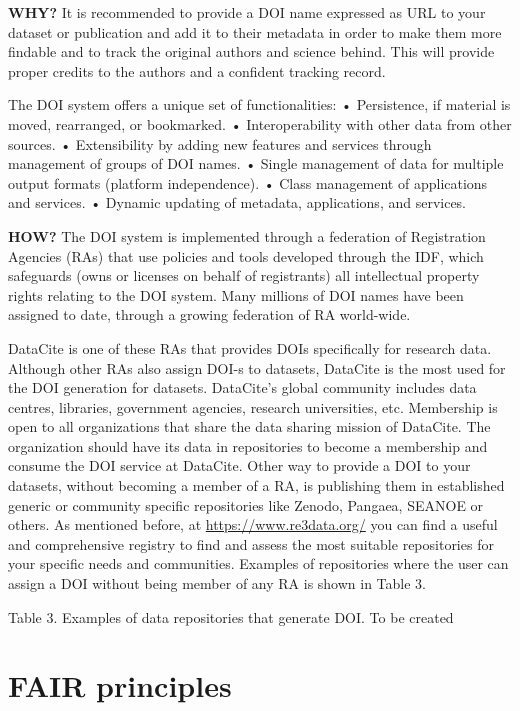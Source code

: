 \documentclass[
]{book}
\begin{document}
\textbf{WHY?}
It is recommended to provide a DOI name expressed as URL to your dataset or publication and add it to their metadata in order to make them more findable and to track the original authors and science behind. This will provide proper credits to the authors and a confident tracking record.

The DOI system offers a unique set of functionalities:
• Persistence, if material is moved, rearranged, or bookmarked.
• Interoperability with other data from other sources.
• Extensibility by adding new features and services through management of groups of DOI names.
• Single management of data for multiple output formats (platform independence).
• Class management of applications and services.
• Dynamic updating of metadata, applications, and services.

\textbf{HOW?}
The DOI system is implemented through a federation of Registration Agencies (RAs) that use policies and tools developed through the IDF, which safeguards (owns or licenses on behalf of registrants) all intellectual property rights relating to the DOI system. Many millions of DOI names have been assigned to date, through a growing federation of RA world-wide.

DataCite is one of these RAs that provides DOIs specifically for research data. Although other RAs also assign DOI-s to datasets, DataCite is the most used for the DOI generation for datasets. DataCite's global community includes data centres, libraries, government agencies, research universities, etc. Membership is open to all organizations that share the data sharing mission of DataCite. The organization should have its data in repositories to become a membership and consume the DOI service at DataCite. Other way to provide a DOI to your datasets, without becoming a member of a RA, is publishing them in established generic or community specific repositories like Zenodo, Pangaea, SEANOE or others. As mentioned before, at \url{https://www.re3data.org/} you can find a useful and comprehensive registry to find and assess the most suitable repositories for your specific needs and communities. Examples of repositories where the user can assign a DOI without being member of any RA is shown in Table 3.

Table 3. Examples of data repositories that generate DOI.
To be created

\hypertarget{fair-principles}{%
\chapter{FAIR principles}\label{fair-principles}}
\end{document}
